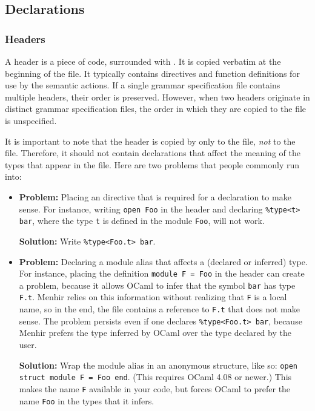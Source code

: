 \documentclass[onecolumn,11pt,nocopyrightspace,preprint]{sigplanconf}
\begin{document}
\subsection{Declarations}
\label{sec:decls}

\subsubsection{Headers}
\label{sec:decls:headers}

A header is a piece of \ocaml code, surrounded with . It is
copied verbatim at the beginning of the \ml file. It typically contains \ocaml
{} directives and function definitions for use by the semantic
actions. If a single grammar specification file contains multiple headers,
their order is preserved. However, when two headers originate in distinct
grammar specification files, the order in which they are copied to the \ml
file is unspecified.

It is important to note that the header is copied by \menhir only to the \ml
file, \emph{not} to the \mli file. Therefore, it should not contain
declarations that affect the meaning of the types that appear in the \mli
file. Here are two problems that people commonly run into:
\begin{itemize}
\item
  \textbf{Problem:} Placing an  directive that is required for a
  \dtype declaration to make sense. For instance, writing \verb+open Foo+ in
  the header and declaring \verb+%type<t> bar+, where the type \verb+t+ is
  defined in the module \verb+Foo+, will not work.
  \par\noindent\textbf{Solution:} Write \verb+%type<Foo.t> bar+.
\item
  \textbf{Problem:} Declaring a module alias that affects a (declared or
  inferred) type. For instance, placing the definition \verb+module F = Foo+
  in the header can create a problem,
  because it allows OCaml to infer that the symbol \verb+bar+ has type
  \verb+F.t+. Menhir relies on this information without realizing that
  \verb+F+ is a local name, so in the end, the \mli file contains a reference
  to \verb+F.t+ that does not make sense. The problem persists even if one
  declares \verb+%type<Foo.t> bar+, because Menhir prefers the type inferred
  by OCaml over the type declared by the user.
  \par\noindent\textbf{Solution:}
  Wrap the module alias in an anonymous structure, like so:
  \verb+open struct module F = Foo end+.
  (This requires OCaml 4.08 or newer.)
  This makes the name \verb+F+ available in your code,
  but forces OCaml to prefer the name \verb+Foo+ in the types that it infers.
\end{itemize}
\end{document}

